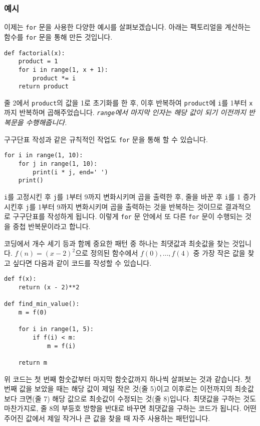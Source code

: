 \documentclass[../main.tex]{subfiles}
\begin{document}
\subsubsection{예시}
이제는 \texttt{for} 문을 사용한 다양한 예시를 살펴보겠습니다.
아래는 팩토리얼을 계산하는 함수를 \texttt{for} 문을 통해 만든 것입니다.
\begin{verbatim}
def factorial(x):
    product = 1
    for i in range(1, x + 1):
        product *= i
    return product
\end{verbatim}
줄 2에서 \texttt{product}의 값을 1로 초기화를 한 후, 이후 반복하여
\verb|product|에 \verb|i|를 1부터 \verb|x|까지 반복하며 곱해주었습니다.
\emph{\texttt{range}에서 마지막 인자는 해당 값이 되기 이전까지 반복문을
수행해줍니다.}

구구단표 작성과 같은 규칙적인 작업도 \texttt{for} 문을 통해 할 수 있습니다.
\begin{verbatim}
for i in range(1, 10):
    for j in range(1, 10):
        print(i * j, end=' ')
    print()
\end{verbatim}
\texttt{i}를 고정시킨 후 \texttt{j}를 1부터 9까지 변화시키며 곱을 출력한 후, 줄을 바꾼 후 \texttt{i}를 1 증가시킨후 \texttt{j}를 1부터 9까지 변화시키며 곱을 출력하는 것을 반복하는 것이므로 결과적으로 구구단표를 작성하게 됩니다.
이렇게 \texttt{for} 문 안에서 또 다른 \texttt{for} 문이 수행되는 것을 중첩 반복문이라고 합니다.

코딩에서 개수 세기 등과 함께 중요한 패턴 중 하나는 최댓값과 최솟값을 찾는 것입니다.
$f(n) = (x - 2)^2$으로 정의된 함수에서 $f(0), \dots, f(4)$ 중 가장 작은 값을
찾고 싶다면 다음과 같이 코드를 작성할 수 있습니다.
\begin{verbatim}
def f(x):
    return (x - 2)**2

def find_min_value():
    m = f(0)

    for i in range(1, 5):
        if f(i) < m:
            m = f(i)

    return m
\end{verbatim}
위 코드는 첫 번째 함숫값부터 마지막 함숫값까지 하나씩 살펴보는 것과 같습니다.
첫 번째 값을 보았을 때는 해당 값이 제일 작은 것(줄 5)이고 이후로는 이전까지의
최솟값보다 크면(줄 7) 해당 값으로 최솟값이 수정되는 것(줄 8)입니다.
최댓값을 구하는 것도 마찬가지로, 줄 8의 부등호 방향을 반대로 바꾸면 최댓값을 구하는 코드가 됩니다.
어떤 주어진 값에서 제일 작거나 큰 값을 찾을 때 자주 사용하는 패턴입니다.
\end{document}
